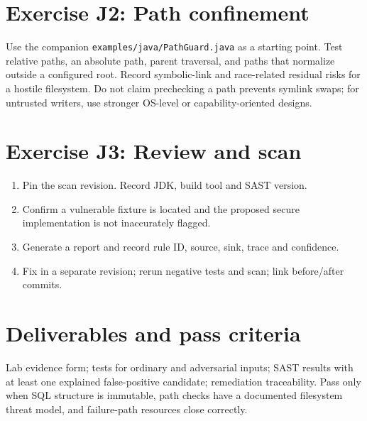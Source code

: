 \documentclass[10pt,letterpaper]{article}
\begin{document}
\section{Exercise J2: Path confinement}
Use the companion \texttt{examples/java/PathGuard.java} as a starting point. Test relative paths, an absolute path, parent traversal, and paths that normalize outside a configured root. Record symbolic-link and race-related residual risks for a hostile filesystem. Do not claim prechecking a path prevents symlink swaps; for untrusted writers, use stronger OS-level or capability-oriented designs.
\section{Exercise J3: Review and scan}
\begin{enumerate}
\item Pin the scan revision. Record JDK, build tool and SAST version.
\item Confirm a vulnerable fixture is located and the proposed secure implementation is not inaccurately flagged.
\item Generate a report and record rule ID, source, sink, trace and confidence.
\item Fix in a separate revision; rerun negative tests and scan; link before/after commits.
\end{enumerate}
\section{Deliverables and pass criteria}
Lab evidence form; tests for ordinary and adversarial inputs; SAST results with at least one explained false-positive candidate; remediation traceability. Pass only when SQL structure is immutable, path checks have a documented filesystem threat model, and failure-path resources close correctly.
\end{document}
